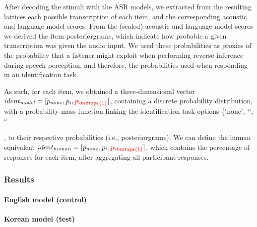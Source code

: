 {After decoding the stimuli with the ASR models, we extracted from the resulting lattices each possible transcription of each item, and the corresponding acoustic and language model scores. %
From the (scaled) acoustic and language model scores we derived the item posteriorgrams, which indicate how probable a given transcription was given the audio input. We used these probabilities as proxies of the probability that a listener might exploit when performing reverse inference during speech perception, and therefore, the probabilities used when responding in an identification task. 

As such, for each item, we obtained a three-dimensional vector $ident_{model} = [p_{none}, p_{i}, {\color{red}p_{\textipa{1}}}]$, containing a discrete probability distribution, with a probability mass function linking the identification task options \{`none', `', `'}, to their respective probabilities (i.e., posteriorgrams).
We can define the human equivalent $ident_{human} = [p_{none}, p_{i}, {\color{red}p_{\textipa{1}}}]$, which contains the percentage of responses for each item, after aggregating all participant responses.

\subsubsection{Results}
\paragraph{English model (control)}


\paragraph{Korean model (test)}







